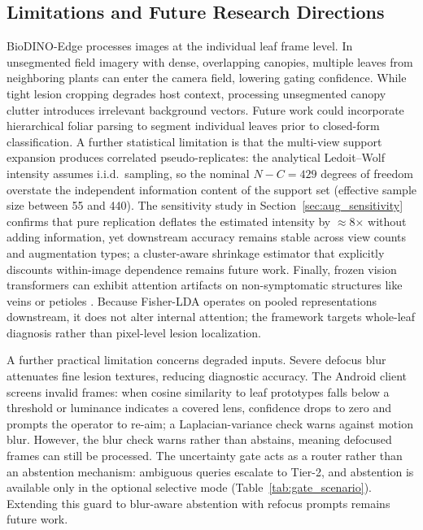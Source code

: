 \documentclass[preprint,12pt]{elsarticle}
\begin{document}
\subsection{Limitations and Future Research Directions}
BioDINO-Edge processes images at the individual leaf frame level. In unsegmented field imagery with dense, overlapping canopies, multiple leaves from neighboring plants can enter the camera field, lowering gating confidence. While tight lesion cropping degrades host context, processing unsegmented canopy clutter introduces irrelevant background vectors. Future work could incorporate hierarchical foliar parsing to segment individual leaves prior to closed-form classification. A further statistical limitation is that the multi-view support expansion produces correlated pseudo-replicates: the analytical Ledoit--Wolf intensity assumes i.i.d.\ sampling, so the nominal $N-C=429$ degrees of freedom overstate the independent information content of the support set (effective sample size between 55 and 440). The sensitivity study in Section~\ref{sec:aug_sensitivity} confirms that pure replication deflates the estimated intensity by $\approx$8$\times$ without adding information, yet downstream accuracy remains stable across view counts and augmentation types; a cluster-aware shrinkage estimator that explicitly discounts within-image dependence remains future work. Finally, frozen vision transformers can exhibit attention artifacts on non-symptomatic structures like veins or petioles \cite{darcet2024vision}. Because Fisher-LDA operates on pooled representations downstream, it does not alter internal attention; the framework targets whole-leaf diagnosis rather than pixel-level lesion localization.

A further practical limitation concerns degraded inputs. Severe defocus blur attenuates fine lesion textures, reducing diagnostic accuracy. The Android client screens invalid frames: when cosine similarity to leaf prototypes falls below a threshold or luminance indicates a covered lens, confidence drops to zero and prompts the operator to re-aim; a Laplacian-variance check warns against motion blur. However, the blur check warns rather than abstains, meaning defocused frames can still be processed. The uncertainty gate acts as a router rather than an abstention mechanism: ambiguous queries escalate to Tier-2, and abstention is available only in the optional selective mode (Table~\ref{tab:gate_scenario}). Extending this guard to blur-aware abstention with refocus prompts remains future work.
\end{document}
